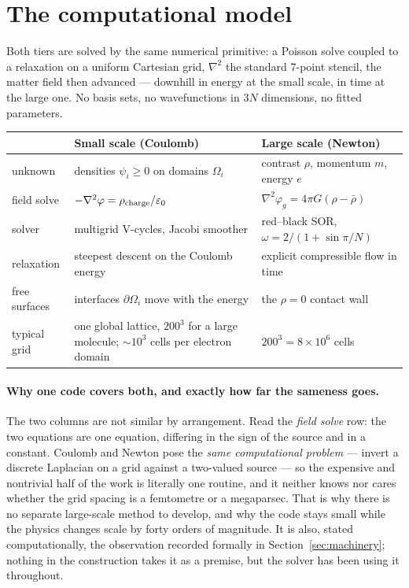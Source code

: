 \documentclass[11pt]{article}
\newcommand{\grad}{\nabla}
\begin{document}
\section{The computational model}\label{sec:computational}
Both tiers are solved by the same numerical primitive: a Poisson solve coupled to a relaxation on a uniform
Cartesian grid, $\grad^2$ the standard 7-point stencil, the matter field then advanced --- downhill in energy at
the small scale, in time at the large one. No basis sets, no wavefunctions in $3N$ dimensions, no fitted
parameters.
\begin{center}
\small
\begin{tabular}{@{}lll@{}}
\toprule
 & \textbf{Small scale (Coulomb)} & \textbf{Large scale (Newton)}\\
\midrule
unknown       & densities $\psi_i\ge0$ on domains $\Omega_i$ & contrast $\rho$, momentum $m$, energy $e$\\
field solve   & $-\grad^2\varphi=\rho_{\rm charge}/\varepsilon_0$ & $\grad^2\varphi_g=4\pi G(\rho-\bar\rho)$\\
solver        & multigrid V-cycles, Jacobi smoother & red--black SOR, $\omega=2/(1+\sin\pi/N)$\\
relaxation    & steepest descent on the Coulomb energy & explicit compressible flow in time\\
free surfaces & interfaces $\partial\Omega_i$ move with the energy & the $\rho=0$ contact wall\\
typical grid  & one global lattice, $200^3$ for a large molecule; ${\sim}10^3$ cells per electron domain &
$200^3=8\times10^6$ cells\\
\bottomrule
\end{tabular}
\end{center}
\paragraph{Why one code covers both, and exactly how far the sameness goes.} The two columns are not similar by
arrangement. Read the \emph{field solve} row: the two equations are one equation, differing in the sign of the
source and in a constant. Coulomb and Newton pose the \emph{same computational problem} --- invert a discrete
Laplacian on a grid against a two-valued source --- so the expensive and nontrivial half of the work is literally
one routine, and it neither knows nor cares whether the grid spacing is a femtometre or a megaparsec. That is why
there is no separate large-scale method to develop, and why the code stays small while the physics changes scale
by forty orders of magnitude. It is also, stated computationally, the observation recorded formally in
Section~\ref{sec:machinery}; nothing in the construction takes it as a premise, but the solver has been using it
throughout.
\end{document}
